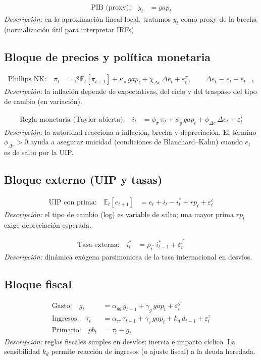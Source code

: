 \documentclass[12pt]{article}
\begin{document}
\begin{align}
\text{PIB (proxy):}\quad 
y_t &= gap_t \tag{2}
\end{align}
\noindent\emph{Descripción:} en la aproximación lineal local, tratamos $y_t$ como proxy de la brecha (normalización útil para interpretar IRFs).

\subsection*{Bloque de precios y política monetaria}
\begin{align}
\text{Phillips NK:}\quad 
\pi_t &= \beta\, \mathbb{E}_t[\pi_{t+1}] + \kappa_\pi\, gap_t + \chi_{\Delta e}\, \Delta e_t + \varepsilon^\pi_t, 
\qquad \Delta e_t \equiv e_t - e_{t-1} \tag{3}
\end{align}
\noindent\emph{Descripción:} la inflación depende de expectativas, del ciclo y del traspaso del tipo de cambio (en variación).

\begin{align}
\text{Regla monetaria (Taylor abierta):}\quad 
i_t &= \phi_\pi\, \pi_t + \phi_y\, gap_t + \phi_{\Delta e}\, \Delta e_t + \varepsilon^i_t \tag{4}
\end{align}
\noindent\emph{Descripción:} la autoridad reacciona a inflación, brecha y depreciación. El término $\phi_{\Delta e}>0$ ayuda a asegurar unicidad (condiciones de Blanchard–Kahn) cuando $e_t$ es de salto por la UIP.

\subsection*{Bloque externo (UIP y tasas)}
\begin{align}
\text{UIP con prima:}\quad 
\mathbb{E}_t[e_{t+1}] &= e_t + i_t - i^*_t + rp_t + \varepsilon^e_t \tag{5}
\end{align}
\noindent\emph{Descripción:} el tipo de cambio (log) es variable de salto; una mayor prima $rp_t$ exige depreciación esperada.

\begin{align}
\text{Tasa externa:}\quad 
i^*_t &= \rho_{i^*}\, i^*_{t-1} + \varepsilon^{i^*}_t \tag{6}
\end{align}
\noindent\emph{Descripción:} dinámica exógena parsimoniosa de la tasa internacional en desvíos.

\subsection*{Bloque fiscal}
\begin{align}
\text{Gasto:}\quad 
g_t &= \alpha_{gg}\, g_{t-1} + \gamma_g\, gap_t + \varepsilon^g_t \tag{7}
\\
\text{Ingresos:}\quad 
\tau_t &= \alpha_{\tau\tau}\, \tau_{t-1} + \gamma_\tau\, gap_t + k_d\, d_{t-1} + \varepsilon^\tau_t \tag{8}
\\
\text{Primario:}\quad 
pb_t &= \tau_t - g_t \tag{9}
\end{align}
\noindent\emph{Descripción:} reglas fiscales simples en desvíos: inercia e impacto cíclico. La sensibilidad $k_d$ permite reacción de ingresos (o ajuste fiscal) a la deuda heredada.
\end{document}
